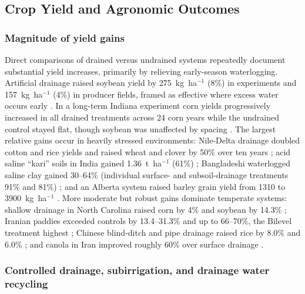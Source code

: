 \subsection{Crop Yield and Agronomic Outcomes}

\subsubsection{Magnitude of yield gains}

Direct comparisons of drained versus undrained systems repeatedly document
substantial yield increases, primarily by relieving early-season waterlogging.
Artificial drainage raised soybean yield by 275~kg~ha$^{-1}$ (8\%) in experiments
and 157~kg~ha$^{-1}$ (4\%) in producer fields, framed as effective where excess
water occurs early \parencite{Mourtzinis2021}. In a long-term Indiana experiment
corn yields progressively increased in all drained treatments across 24 corn
years while the undrained control stayed flat, though soybean was unaffected by
spacing \parencite{Rui2024,Kladivko2005}. The largest relative gains occur in
heavily stressed environments: Nile-Delta drainage doubled cotton and rice yields
and raised wheat and clover by 50\% over ten years \parencite{ELMOWELHI1988};
acid saline ``kari'' soils in India gained 1.36~t~ha$^{-1}$ (61\%)
\parencite{Mathew2001}; Bangladeshi waterlogged saline clay gained 30--64\%
(individual surface- and subsoil-drainage treatments 91\% and 81\%)
\parencite{Islam2025,Islam2022}; and an Alberta system raised barley grain yield
from 1310 to 3900~kg~ha$^{-1}$ \parencite{BENNETT1982}. More moderate but robust
gains dominate temperate systems: shallow drainage in North Carolina raised corn
by 4\% and soybean by 14.3\% \parencite{Watkins2024}; Iranian paddies exceeded
controls by 13.4--31.3\% and up to 66--70\%, the Bilevel treatment highest
\parencite{DarziNaftchali2017b,DarziNaftchali2014}; Chinese blind-ditch and pipe
drainage raised rice by 8.0\% and 6.0\% \parencite{Qi2025b}; and canola in Iran
improved roughly 60\% over surface drainage
\parencite{Asgari2021,Yang2022,Zhang2024c,SerranoCoronel2018}.

\subsubsection{Controlled drainage, subirrigation, and drainage water recycling}

